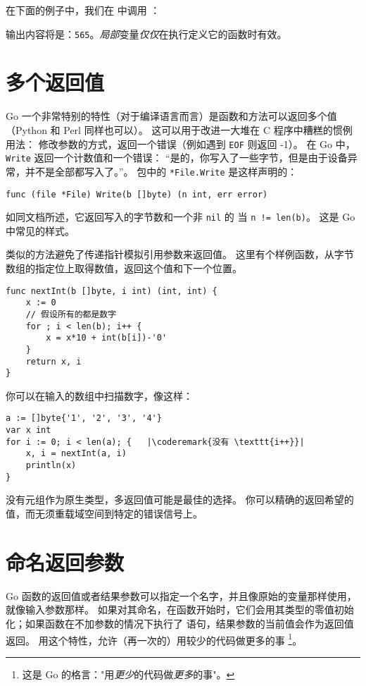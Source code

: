 在下面的例子中，我们在  中调用 ：



输出内容将是：\texttt{565}。\emph{局部}变量\emph{仅仅}在执行定义它的函数时有效。

\section{多个返回值}
\label{sec:multiple return}
Go 一个非常特别的特性（对于编译语言而言）是函数和方法可以返回多个值（Python 和 Perl 同样也可以）。
这可以用于改进一大堆在 C 程序中糟糕的惯例用法：
修改参数的方式，返回一个错误（例如遇到 \texttt{EOF} 则返回 -1）。
在 Go 中，\lstinline{Write} 返回一个计数值和一个错误：
``是的，你写入了一些字节，但是由于设备异常，并不是全部都写入了。''。
 包中的 \lstinline{*File.Write} 是这样声明的：
\begin{lstlisting}
func (file *File) Write(b []byte) (n int, err error)
\end{lstlisting}
如同文档所述，它返回写入的字节数和一个非 \lstinline{nil} 的 
当 \lstinline{n != len(b)}。
这是 Go 中常见的样式。

类似的方法避免了传递指针模拟引用参数来返回值。
这里有个样例函数，从字节数组的指定位上取得数值，返回这个值和下一个位置。
\begin{lstlisting}
func nextInt(b []byte, i int) (int, int) {
    x := 0
    // 假设所有的都是数字
    for ; i < len(b); i++ {
        x = x*10 + int(b[i])-'0'
    }
    return x, i
}
\end{lstlisting}
你可以在输入的数组中扫描数字，像这样：
\begin{lstlisting}
a := []byte{'1', '2', '3', '4'}
var x int
for i := 0; i < len(a); {	|\coderemark{没有 \texttt{i++}}|
    x, i = nextInt(a, i)
    println(x)
}
\end{lstlisting}
没有元组作为原生类型，多返回值可能是最佳的选择。
你可以精确的返回希望的值，而无须重载域空间到特定的错误信号上。

\section{命名返回参数}
\label{sec:named result parameters}
Go 函数的返回值或者结果参数可以指定一个名字，并且像原始的变量那样使用，就像输入参数那样。
如果对其命名，在函数开始时，它们会用其类型的零值初始化；如果函数在不加参数的情况下执行了
 语句，结果参数的当前值会作为返回值返回。
用这个特性，允许（再一次的）用较少的代码做更多的事
\footnote{这是 Go 的格言："用\emph{更少}的代码做\emph{更多}的事"。}。

